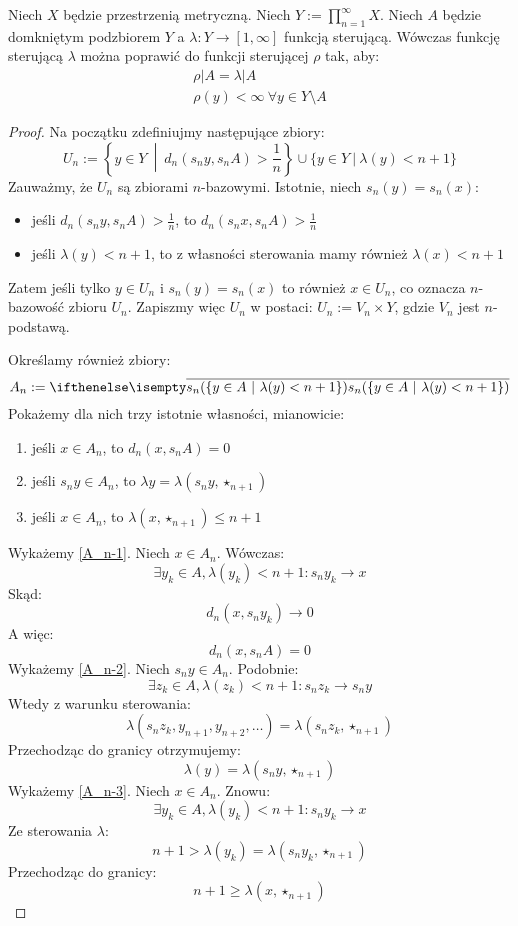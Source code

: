 \begin{thm}
\label{thm:steering-function}
Niech $X$ będzie przestrzenią metryczną. Niech $Y := \prod_{n=1}^\infty X$. Niech $A$ będzie domkniętym podzbiorem $Y$ a $\lambda: Y \rightarrow [1,\infty]$ funkcją sterującą. Wówczas funkcję sterującą $\lambda$ można poprawić do funkcji sterującej $\rho$ tak, aby:
\begin{gather*}
 \rho|A = \lambda|A \\
 \rho(y) < \infty\ \forall y \in Y \setminus A
\end{gather*}

\begin{proof}
  Na początku zdefiniujmy następujące zbiory:
  \[
    U_n := \left\{y \in Y\ \middle|\ d_n(s_n y, s_n A) > \frac{1}{n}\right\} \cup \{y \in Y\ |\ \lambda(y) < n+1\}
  \]
  Zauważmy, że $U_n$ są zbiorami $n$-bazowymi. Istotnie, niech $s_n(y) = s_n(x)$:
  \begin{itemize}
    \item jeśli $d_n(s_n y, s_n A) > \frac{1}{n}$, to $d_n(s_n x, s_n A) > \frac{1}{n}$
    \item jeśli $\lambda(y) < n+1$, to z własności sterowania mamy również $\lambda(x) < n+1$
  \end{itemize}
  Zatem jeśli tylko $y \in U_n$ i $s_n(y) = s_n(x)$ to również $x \in U_n$, co oznacza $n$-bazowość zbioru $U_n$. Zapiszmy więc $U_n$ w postaci: $U_n := V_n \times Y$, gdzie $V_n$ jest $n$-podstawą.
  
  Określamy również zbiory:
  \[
    A_n := \cl{s_n({\{y \in A\ |\ \lambda(y) < n+1\}})}
  \]
  Pokażemy dla nich trzy istotnie własności, mianowicie:
  \begin{enumerate}[(1)]
    \item \label{A_n-1} jeśli $x \in A_n$, to $d_n(x, s_n A) = 0$
    \item \label{A_n-2} jeśli $s_n y \in A_n$, to $\lambda y = \lambda(s_n y,\star_{n+1})$
    \item \label{A_n-3} jeśli $x \in A_n$, to $\lambda(x,\star_{n+1}) \leq n+1$
  \end{enumerate}
  Wykażemy \ref{A_n-1}. Niech $x \in A_n$. Wówczas:
  \[
    \exists y_k \in A, \lambda(y_k) < n+1: s_n y_k \to x
  \]
  Skąd:
  \[
    d_n(x, s_n y_k) \to 0
  \]
  A więc:
  \[
    d_n(x, s_n A) = 0
  \]
  Wykażemy \ref{A_n-2}. Niech $s_n y \in A_n$. Podobnie:
  \[
    \exists z_k \in A, \lambda(z_k) < n+1: s_n z_k \to s_n y
  \]
  Wtedy z warunku sterowania:
  \[
    \lambda(s_n z_k, y_{n+1}, y_{n+2}, \ldots) = \lambda(s_n z_k,\star_{n+1})
  \]
  Przechodząc do granicy otrzymujemy:
  \[
    \lambda(y) = \lambda(s_n y,\star_{n+1})
  \]
  Wykażemy \ref{A_n-3}. Niech $x \in A_n$. Znowu:
  \[
    \exists y_k \in A, \lambda(y_k) < n+1: s_n y_k \to x
  \]
  Ze sterowania $\lambda$:
  \[
    n+1 > \lambda(y_k) = \lambda(s_n y_k, \star_{n+1})
  \]
  Przechodząc do granicy:
  \[
    n+1 \geq \lambda(x, \star_{n+1})
  \]
  

\end{proof}
\end{thm}
